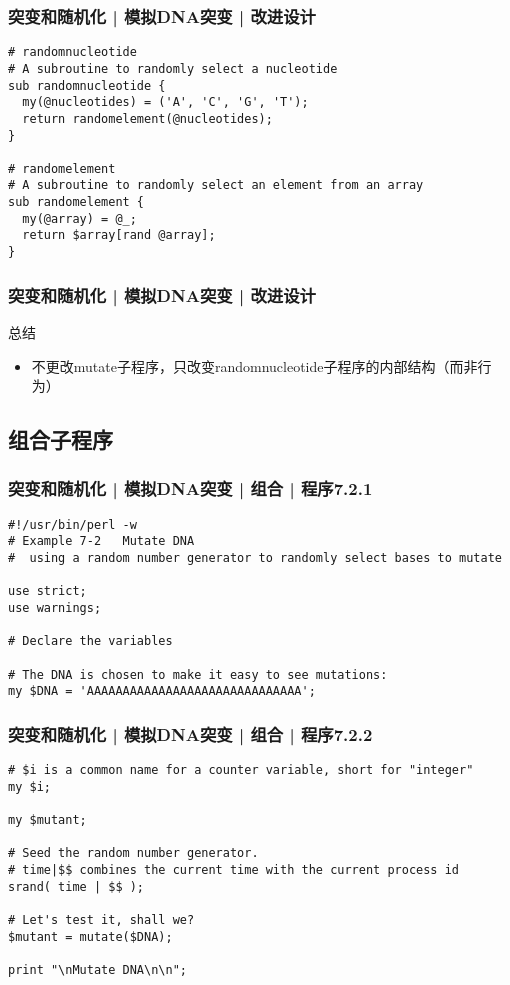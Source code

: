 \begin{frame}[fragile]
  \frametitle{突变和随机化 | 模拟DNA突变 | 改进设计}
\begin{lstlisting}
# randomnucleotide
# A subroutine to randomly select a nucleotide
sub randomnucleotide {
  my(@nucleotides) = ('A', 'C', 'G', 'T');
  return randomelement(@nucleotides);
}

# randomelement
# A subroutine to randomly select an element from an array
sub randomelement {
  my(@array) = @_;
  return $array[rand @array];
}
\end{lstlisting}
\end{frame}

\begin{frame}[fragile]
  \frametitle{突变和随机化 | 模拟DNA突变 | 改进设计}
  \begin{block}{总结}
    \begin{itemize}
      \item 不更改mutate子程序，只改变randomnucleotide子程序的内部结构（而非行为）
    \end{itemize}
  \end{block}
\end{frame}

\subsection{组合子程序}
\begin{frame}[fragile]
  \frametitle{突变和随机化 | 模拟DNA突变 | 组合 | 程序7.2.1}
\begin{lstlisting}[firstnumber=1]
#!/usr/bin/perl -w
# Example 7-2   Mutate DNA
#  using a random number generator to randomly select bases to mutate

use strict;
use warnings;

# Declare the variables

# The DNA is chosen to make it easy to see mutations:
my $DNA = 'AAAAAAAAAAAAAAAAAAAAAAAAAAAAAA';
\end{lstlisting}
\end{frame}

\begin{frame}[fragile]
  \frametitle{突变和随机化 | 模拟DNA突变 | 组合 | 程序7.2.2}
\begin{lstlisting}[firstnumber=13]
# $i is a common name for a counter variable, short for "integer"
my $i;

my $mutant;

# Seed the random number generator.
# time|$$ combines the current time with the current process id
srand( time | $$ );

# Let's test it, shall we?
$mutant = mutate($DNA);

print "\nMutate DNA\n\n";
\end{lstlisting}
\end{frame}

